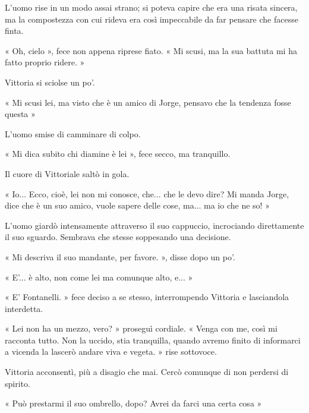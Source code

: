 L'uomo rise in un modo assai strano; si poteva capire che era una risata sincera, ma la compostezza con cui rideva era così impeccabile da far pensare che facesse finta.

« Oh, cielo », fece non appena riprese fiato. « Mi scusi, ma la sua battuta mi ha fatto proprio ridere. »

Vittoria si sciolse un po'.

« Mi scusi lei, ma visto che è un amico di Jorge, pensavo che la tendenza fosse questa »

L'uomo smise di camminare di colpo.

« Mi dica subito chi diamine è lei », fece secco, ma tranquillo.

Il cuore di Vittoriale saltò in gola.

« Io... Ecco, cioè, lei non mi conosce, che... che le devo dire? Mi manda Jorge, dice che è un suo amico, vuole sapere delle cose, ma... ma io che ne so! »

L'uomo giardò intensamente attraverso il suo cappuccio, incrociando direttamente il suo sguardo. Sembrava che stesse soppesando una decisione.

« Mi descriva il suo mandante, per favore. », disse dopo un po'.

« E'... è alto, non come lei ma comunque alto, e... »

« E' Fontanelli. » fece deciso a se stesso, interrompendo Vittoria e lasciandola interdetta.

« Lei non ha un mezzo, vero? » proseguì cordiale. « Venga con me, così mi racconta tutto. Non la uccido, stia tranquilla, quando avremo finito di informarci a vicenda la lascerò andare viva e vegeta. » rise sottovoce.

Vittoria acconsentì, più a disagio che mai. Cercò comunque di non perdersi di spirito.

« Può prestarmi il suo ombrello, dopo? Avrei da farci una certa cosa »
